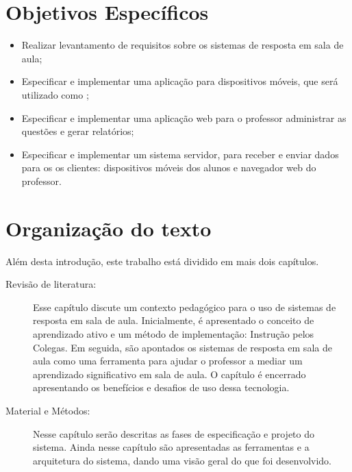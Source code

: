 \section{Objetivos Específicos}

\begin{itemize}
    \item Realizar levantamento de requisitos sobre os sistemas de resposta em sala de aula;
    \item Especificar e implementar uma aplicação para dispositivos móveis, que será utilizado como {\clickers};
    \item Especificar e implementar uma aplicação web para o professor administrar as questões e gerar relatórios;
    \item Especificar e implementar um sistema servidor, para receber e
    enviar dados para os os clientes: dispositivos móveis dos alunos e navegador
    web do professor.
\end{itemize}

\section{Organização do texto}
Além desta introdução, este trabalho está dividido em mais dois capítulos.

\begin{description}
  \item[Revisão de literatura:] Esse capítulo discute um contexto pedagógico
  para o uso de sistemas de resposta em sala de aula. Inicialmente, é
  apresentado o conceito de aprendizado ativo e um método de implementação: Instrução pelos Colegas.
  Em seguida, são apontados os sistemas de resposta em sala de aula como uma
  ferramenta para ajudar o professor a mediar um aprendizado significativo  em
  sala de aula. O capítulo é encerrado apresentando os benefícios e desafios de uso dessa tecnologia.

  \item[Material e Métodos:] Nesse capítulo serão descritas as fases de especificação e projeto do sistema.
  Ainda nesse capítulo são apresentadas as ferramentas e a arquitetura
  do sistema, dando uma visão geral do que foi desenvolvido.

\end{description}
